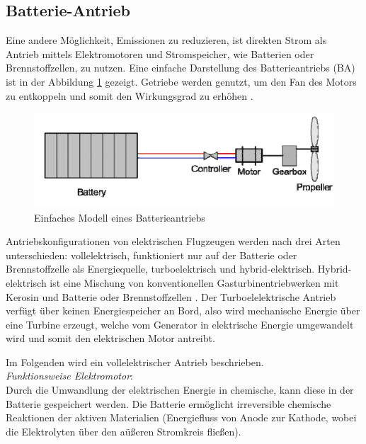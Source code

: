 \subsection{Batterie-Antrieb}
Eine andere Möglichkeit, Emissionen zu reduzieren, ist direkten Strom als Antrieb 
mittels Elektromotoren und Stromspeicher, wie Batterien oder Brennstoffzellen, zu nutzen.
Eine einfache Darstellung des Batterieantriebs (BA) ist in der Abbildung \ref{ba} gezeigt. 
Getriebe werden genutzt, um den Fan des Motors zu entkoppeln und somit den Wirkungsgrad zu erhöhen \cite{hepperle2012electric}.
%
\begin{figure}[h]
	\centering
	\includegraphics[width=0.7\linewidth]{Bilder/BA.png}
	\caption[Einfaches Modell eines Batterieantriebs]{Einfaches Modell eines Batterieantriebs \cite{hepperle2012electric}}
	\label{ba}
\end{figure}

Antriebskonfigurationen von elektrischen Flugzeugen werden nach drei Arten unterschieden: 
vollelektrisch, funktioniert nur auf der Batterie oder Brennstoffzelle als Energiequelle, 
turboelektrisch und hybrid-elektrisch. 
Hybrid-elektrisch ist eine Mischung von konventionellen Gasturbinentriebwerken mit Kerosin 
und Batterie oder Brennstoffzellen \cite{dahal2021techno}. 
Der Turboelelektrische Antrieb verfügt über keinen Energiespeicher an Bord, 
also wird mechanische Energie über eine Turbine erzeugt, welche vom Generator in elektrische Energie 
umgewandelt wird und somit den elektrischen Motor antreibt. %

Im Folgenden wird ein vollelektrischer Antrieb beschrieben.\\
%
\textit{Funktionsweise Elektromotor}: \\
Durch die Umwandlung der elektrischen Energie in chemische, 
kann diese in der Batterie gespeichert werden.
Die Batterie ermöglicht irreversible chemische Reaktionen der aktiven Materialien 
(Energiefluss von Anode zur Kathode, wobei die Elektrolyten über den aüßeren Stromkreis fließen).

